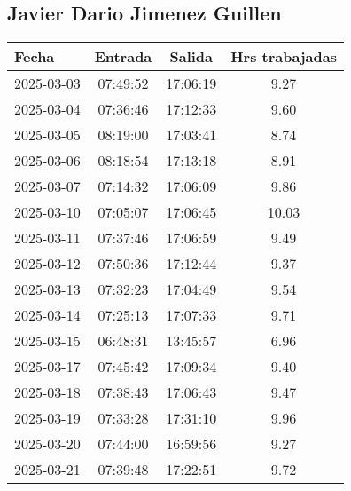\documentclass[11pt,a4paper]{article}
\newcommand{\mejoradatabla}[1]{
  \renewcommand{\arraystretch}{1.3}
  \setlength{\tabcolsep}{10pt}
  #1
  \renewcommand{\arraystretch}{1}
  \setlength{\tabcolsep}{6pt}
}
\begin{document}
\clearpage


\subsection{ Javier Dario  Jimenez Guillen }

\begin{minipage}[t]{0.62\textwidth}
\mejoradatabla{
\begin{tabular}{lccc}
\toprule
\rowcolor{grisclaro} \textbf{Fecha} & \textbf{Entrada} & \textbf{Salida} & \textbf{Hrs trabajadas}\\
\midrule

2025-03-03 & 07:49:52 & 17:06:19 & 9.27\\

2025-03-04 & 07:36:46 & 17:12:33 & 9.60\\

2025-03-05 & 08:19:00 & 17:03:41 & 8.74\\

2025-03-06 & 08:18:54 & 17:13:18 & 8.91\\

2025-03-07 & 07:14:32 & 17:06:09 & 9.86\\

2025-03-10 & 07:05:07 & 17:06:45 & 10.03\\

2025-03-11 & 07:37:46 & 17:06:59 & 9.49\\

2025-03-12 & 07:50:36 & 17:12:44 & 9.37\\

2025-03-13 & 07:32:23 & 17:04:49 & 9.54\\

2025-03-14 & 07:25:13 & 17:07:33 & 9.71\\

2025-03-15 & 06:48:31 & 13:45:57 & 6.96\\

2025-03-17 & 07:45:42 & 17:09:34 & 9.40\\

2025-03-18 & 07:38:43 & 17:06:43 & 9.47\\

2025-03-19 & 07:33:28 & 17:31:10 & 9.96\\

2025-03-20 & 07:44:00 & 16:59:56 & 9.27\\

2025-03-21 & 07:39:48 & 17:22:51 & 9.72\\


\end{tabular}}
\end{minipage}
\end{document}
